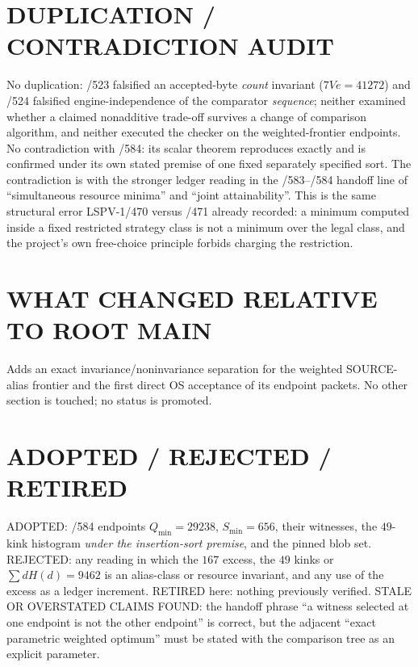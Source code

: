 \documentclass[11pt]{article}
\begin{document}
\section*{DUPLICATION / CONTRADICTION AUDIT}
No duplication: /523 falsified an accepted-byte \emph{count} invariant ($7Ve=41272$) and /524 falsified engine-independence of the comparator \emph{sequence}; neither examined whether a claimed nonadditive trade-off survives a change of comparison algorithm, and neither executed the checker on the weighted-frontier endpoints. No contradiction with /584: its scalar theorem reproduces exactly and is confirmed under its own stated premise of one fixed separately specified sort. The contradiction is with the stronger ledger reading in the /583--/584 handoff line of ``simultaneous resource minima'' and ``joint attainability''. This is the same structural error LSPV-1/470 versus /471 already recorded: a minimum computed inside a fixed restricted strategy class is not a minimum over the legal class, and the project's own free-choice principle forbids charging the restriction.

\section*{WHAT CHANGED RELATIVE TO ROOT MAIN}
Adds an exact invariance/noninvariance separation for the weighted SOURCE-alias frontier and the first direct OS acceptance of its endpoint packets. No other section is touched; no status is promoted.

\section*{ADOPTED / REJECTED / RETIRED}
ADOPTED: /584 endpoints $Q_{\min}=29238$, $S_{\min}=656$, their witnesses, the $49$-kink histogram \emph{under the insertion-sort premise}, and the pinned blob set. REJECTED: any reading in which the $167$ excess, the $49$ kinks or $\sum dH(d)=9462$ is an alias-class or resource invariant, and any use of the excess as a ledger increment. RETIRED here: nothing previously verified. STALE OR OVERSTATED CLAIMS FOUND: the handoff phrase ``a witness selected at one endpoint is not the other endpoint'' is correct, but the adjacent ``exact parametric weighted optimum'' must be stated with the comparison tree as an explicit parameter.
\end{document}
